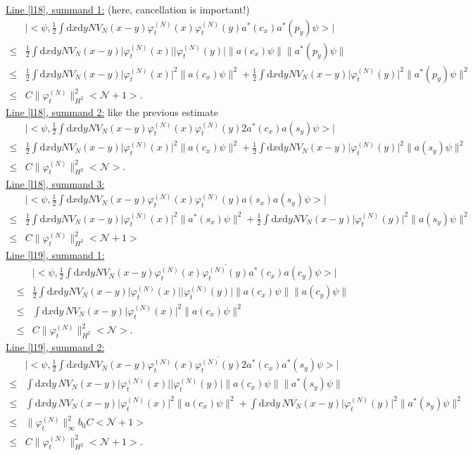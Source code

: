 \documentclass[11pt,a4paper]{scrartcl}
\newcommand{\di}{\textrm{d}}		%
\newcommand{\Ncal}{\mathcal{N}}		%
\newcommand{\estlist}[2]{\underline{Line \ref{l#1}, summand #2:}}
\newcommand{\scal}[2]{\big<#1,#2\big>} %
\newcommand{\cc}[1]{\overline{#1}}	%
\newcommand{\norm}[1]{\lVert#1\rVert}	%
\newcommand{\ev}[1]{\big<#1\big>}	%
\newcommand{\ph}{\varphi_t^{(N)}}	%
\newcommand{\dxyNV}{\frac{1}{2}\int \di x\di y N V_N(x-y)} %
\begin{document}
\estlist{18}{1} (here, cancellation is important!)
\begin{align*}
& \lvert \scal{\psi}{\dxyNV \ph(x)\ph(y) a^\ast(c_x) a^\ast(p_y)\psi} \rvert \\
\leq & \dxyNV \lvert\ph(x)\rvert \lvert\ph(y)\rvert \norm{a(c_x)\psi} \norm{a^\ast(p_y)\psi}\\
\leq & \dxyNV \lvert \ph(x)\rvert^2 \norm{a(c_x)\psi}^2 + \dxyNV \lvert\ph(y)\rvert^2 \norm{a^\ast(p_y)\psi}^2 \\
\leq & C\norm{\ph}_{H^2}^2 \ev{\Ncal+1}. 
\end{align*}
\estlist{18}{2} like the previous estimate
\begin{align*}
& \lvert \scal{\psi}{\dxyNV \ph(x)\ph(y) 2a^\ast(c_x)a(s_y)\psi} \rvert \\
\leq & \dxyNV \lvert\ph(x)\rvert^2 \norm{a(c_x)\psi}^2 + \dxyNV \lvert \ph(y)\rvert^2 \norm{a(s_y)\psi}^2 \\
\leq & C\norm{\ph}_{H^2}^2 \ev{\Ncal}.
\end{align*}
\estlist{18}{3}
\begin{align*}
 & \lvert \scal{\psi}{\dxyNV \ph(x)\ph(y) a(s_x) a(s_y)\psi} \rvert \\
\leq & \dxyNV \lvert \ph(x)\rvert^2 \norm{a^\ast(s_x)\psi}^2 + \dxyNV \lvert \ph(y)\rvert^2 \norm{a(s_y)\psi}^2 \\
\leq & C\norm{\ph}_{H^2}^2 \ev{\Ncal+1}
\end{align*}
\estlist{19}{1}
\begin{align*}
 & \lvert \scal{\psi}{\dxyNV \ph(x) \cc{\ph(y)} a^\ast(c_x)a(c_y)\psi} \rvert \\
\leq & \dxyNV \lvert \ph(x)\rvert \lvert\ph(y)\rvert \norm{a(c_x)\psi} \norm{a(c_y)\psi} \\
\leq & \int \di x \di y\, NV_N(x-y) \lvert \ph(x)\rvert^2 \norm{a(c_x)\psi}^2 \\
\leq & C \norm{\ph}_{H^2}^2 \ev{\Ncal}.
\end{align*}
\estlist{19}{2}
\begin{align*}
 & \lvert \scal{\psi}{\dxyNV \ph(x)\cc{\ph(y)} 2a^\ast(c_x) a^\ast(s_y)\psi} \rvert \\
\leq & \int \di x\di y\, NV_N(x-y) \lvert \ph(x)\rvert \lvert \ph(y)\rvert \norm{a(c_x)\psi} \norm{a^\ast(s_y)\psi}\\
\leq & \int \di x\di y\, NV_N(x-y) \lvert \ph(x)\rvert^2 \norm{a(c_x)\psi}^2 + \int \di x\di y\, NV_N(x-y) \lvert\ph(y)\rvert^2 \norm{a^\ast(s_y)\psi}^2 \\
\leq & \norm{\ph}_\infty^2 b_0 C \ev{\Ncal+1} \\
\leq & C\norm{\ph}_{H^2}^2 \ev{\Ncal+1}.
\end{align*}
\end{document}
